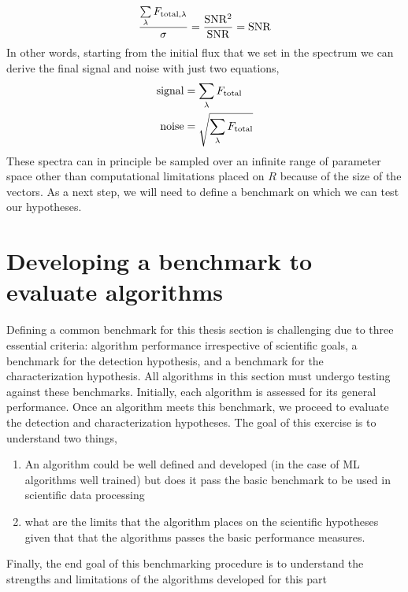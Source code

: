 \begin{equation}
   \dfrac{\sum\limits_{\lambda}F_{\rm{total,\lambda}}}{\sigma}=\rm{\dfrac{SNR^2}{SNR}= SNR }
\end{equation}
In other words, starting from the initial flux that we set in the spectrum we can derive the final signal and noise with just two equations,
\begin{eqnarray}
    \rm{signal} &= \sum\limits_{\lambda}F_{\rm{total}}\\
    \rm{noise} &= \sqrt{\sum\limits_{\lambda}F_{\rm{total}}}\\
\end{eqnarray}
These spectra can in principle be sampled over an infinite range of parameter space other than computational limitations placed on $R$ because of the size of the vectors.
As a next step, we will need to define a benchmark on which we can test our hypotheses.


\section{Developing a benchmark to evaluate algorithms}
Defining a common benchmark for this thesis section is challenging due to three essential criteria: algorithm performance irrespective of scientific goals, a benchmark for the detection hypothesis, and a benchmark for the characterization hypothesis. All algorithms in this section must undergo testing against these benchmarks. Initially, each algorithm is assessed for its general performance. Once an algorithm meets this benchmark, we proceed to evaluate the detection and characterization hypotheses.
The goal of this exercise is to understand two things,
\begin{enumerate}
    \item An algorithm could be well defined and developed (in the case of ML algorithms well trained) but does it pass the basic benchmark to be used in scientific data processing
    \item what are the limits that the algorithm places on the scientific hypotheses given that that the algorithms passes the basic performance measures.
\end{enumerate}
Finally, the end goal of this benchmarking procedure is to understand the strengths and limitations of the algorithms developed for this part

